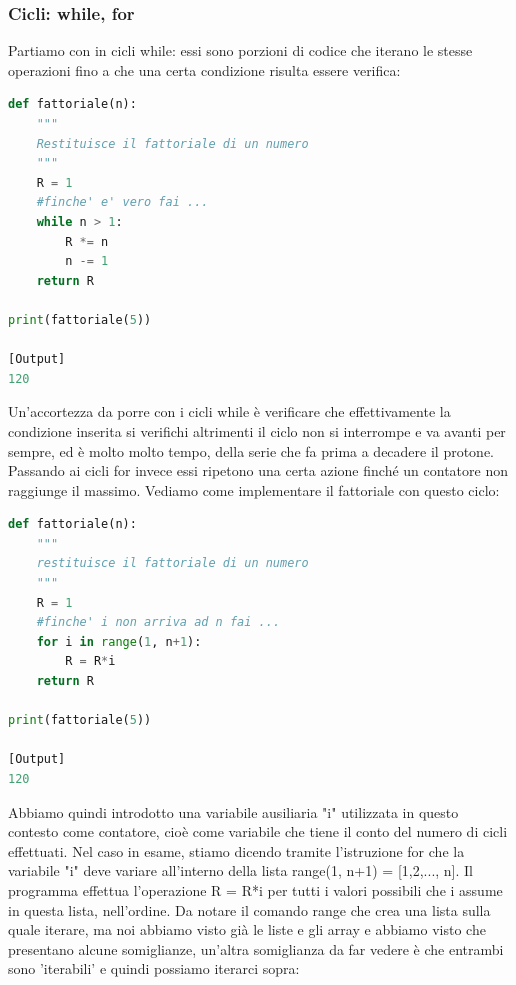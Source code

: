 \documentclass[10pt,a4paper]{article}
\begin{document}
\subsubsection{Cicli: while, for}
Partiamo con in cicli while: essi sono porzioni di codice che iterano le stesse operazioni fino a che una certa condizione risulta essere verifica:

\begin{lstlisting}[language=Python]
def fattoriale(n):
    """
    Restituisce il fattoriale di un numero
    """
    R = 1
    #finche' e' vero fai ...
    while n > 1:
        R *= n
        n -= 1
    return R
    
print(fattoriale(5))

[Output]
120
\end{lstlisting}
Un'accortezza da porre con i cicli while è verificare che effettivamente la condizione inserita si verifichi altrimenti il ciclo non si interrompe e va avanti per sempre, ed è molto molto tempo, della serie che fa prima a decadere il protone.\\

Passando ai cicli for invece essi ripetono una certa azione finché un contatore non raggiunge il massimo. Vediamo come implementare il fattoriale con questo ciclo:

\begin{lstlisting}[language=Python]
def fattoriale(n):
    """
    restituisce il fattoriale di un numero
    """
    R = 1
    #finche' i non arriva ad n fai ...
    for i in range(1, n+1):
        R = R*i
    return R
    
print(fattoriale(5))

[Output]
120
\end{lstlisting}
Abbiamo quindi introdotto una variabile ausiliaria "i" utilizzata in questo contesto come contatore, cioè come variabile che tiene il conto del numero di cicli effettuati. Nel caso in esame, stiamo dicendo tramite l'istruzione for che la variabile "i" deve variare all'interno della lista range(1, n+1) = [1,2,..., n]. Il programma effettua l'operazione R = R*i per tutti i valori possibili che i assume in questa lista, nell'ordine. Da notare il comando range che crea una lista sulla quale iterare, ma noi abbiamo visto già le liste e gli array e abbiamo visto che presentano alcune somiglianze, un'altra somiglianza da far vedere è che entrambi sono 'iterabili' e quindi possiamo iterarci sopra:
 
\end{document}

